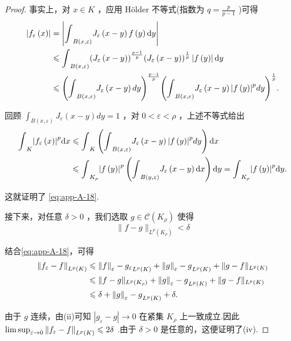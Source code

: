 \begin{proof}
事实上，对 $x \in  K$ ，应用 Hölder 不等式(指数为 $q = \frac{p}{p - 1}$ )可得
{\setjot[-2]\begin{align*}
    \left| {{f}_{\varepsilon }\left( x\right) }\right|  &= \left| {{\int }_{B\left( {x,\varepsilon }\right) }{J}_{\varepsilon }\left( {x - y}\right) f\left( y\right) {\mathop{}\!\mathrm{d} y}}\right|\\
    &\leqslant  {\int }_{B\left( {x,\varepsilon }\right) }{\left( {J}_{\varepsilon }\left( x - y\right) \right) }^{\frac{p - 1}{p}}{\left( {J}_{\varepsilon }\left( x - y\right) \right) }^{\frac{1}{p}}\left| {f\left( y\right) }\right| {\mathop{}\!\mathrm{d} y}\\
    &\leqslant  {\left( {\int }_{B\left( {x,\varepsilon }\right) }{J}_{\varepsilon }\left( x - y\right) dy\right) }^{\frac{p - 1}{p}}{\left( {\int }_{B\left( {x,\varepsilon }\right) }{J}_{\varepsilon }\left( x - y\right) {\left| f\left( y\right) \right| }^{p}dy\right) }^{\frac{1}{p}}.
\end{align*}}


回顾 ${\int }_{B\left( {x,\varepsilon }\right) }{J}_{\varepsilon }\left( {x - y}\right) {dy} = 1$ ，对 $0 < \varepsilon  < \rho$ ，上述不等式给出
{\setjot[-2]\begin{align*}
    {\int }_{K}{\left| {f}_{\varepsilon }\left( x\right) \right| }^{p}{\mathop{}\!\mathrm{d} x} &\leqslant  {\int }_{K}\left( {{\int }_{B\left( {x,\varepsilon }\right) }{J}_{\varepsilon }\left( {x - y}\right) {\left| f\left( y\right) \right| }^{p}{dy}}\right) {\mathop{}\!\mathrm{d} x}\\
    &\leqslant  {\int }_{{K}_{\rho }}{\left| f\left( y\right) \right| }^{p}\left( {{\int }_{B\left( {y,\varepsilon }\right) }{J}_{\varepsilon }\left( {x - y}\right) {\mathop{}\!\mathrm{d} x}}\right) {\mathop{}\!\mathrm{d} y} = {\int }_{{K}_{\rho }}{\left| f\left( y\right) \right| }^{p}{\mathop{}\!\mathrm{d} y}.
\end{align*}}

这就证明了 \eqref{eq:app-A-18}.

接下来，对任意 $\delta  > 0$ ，我们选取 $g \in  \mathcal{C}\left( {K}_{\rho }\right)$ 使得
\[
\| f - g{\| }_{{L}^{p}\left( {K}_{\rho }\right) } < \delta
\]

结合\eqref{eq:app-A-18}，可得
{\setjot[-2]\begin{align*}
    {\norm{f_{\varepsilon } - f}}_{{L}^{p}\left( K\right) } &\leqslant  {\norm{f}_{\varepsilon } - {g}_{\varepsilon }}_{{L}^{p}\left( K\right) } + {\norm{g}_{\varepsilon } - g}_{{L}^{p}\left( K\right) } + \| g - f{\| }_{{L}^{p}\left( K\right) }\\
    &\leqslant  \| f - g{\| }_{{L}^{p}\left( {K}_{\rho }\right) } + {\norm{g}_{\varepsilon } - g}_{{L}^{p}\left( K\right) } + \| g - f{\| }_{{L}^{p}\left( K\right) }\\
    &\leqslant  \delta  + {\norm{g}_{\varepsilon } - g}_{{L}^{p}\left( K\right) } + \delta .
\end{align*}}


由于 $g$ 连续，由(ii)可知 $\left| {{g}_{\varepsilon } - g}\right|  \rightarrow  0$ 在紧集 ${K}_{\rho }$ 上一致成立.因此 $\limsup_{{\varepsilon  \rightarrow  0}}{\norm{f_{\varepsilon } - f}}_{{L}^{p}\left( K\right) } \leqslant  {2\delta }$ .由于 $\delta  > 0$ 是任意的，这便证明了(iv).
\end{proof}

